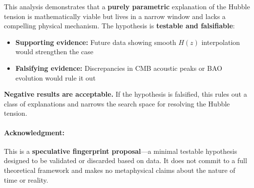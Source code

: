 This analysis demonstrates that a \textbf{purely parametric} explanation of the Hubble tension is mathematically viable but lives in a narrow window and lacks a compelling physical mechanism. The hypothesis is \textbf{testable and falsifiable}:
\begin{itemize}
    \item \textbf{Supporting evidence:} Future data showing smooth $H(z)$ interpolation would strengthen the case
    \item \textbf{Falsifying evidence:} Discrepancies in CMB acoustic peaks or BAO evolution would rule it out
\end{itemize}

\textbf{Negative results are acceptable.} If the hypothesis is falsified, this rules out a class of explanations and narrows the search space for resolving the Hubble tension.

\paragraph{Acknowledgment:} This is a \textbf{speculative fingerprint proposal}—a minimal testable hypothesis designed to be validated or discarded based on data. It does not commit to a full theoretical framework and makes no metaphysical claims about the nature of time or reality.
